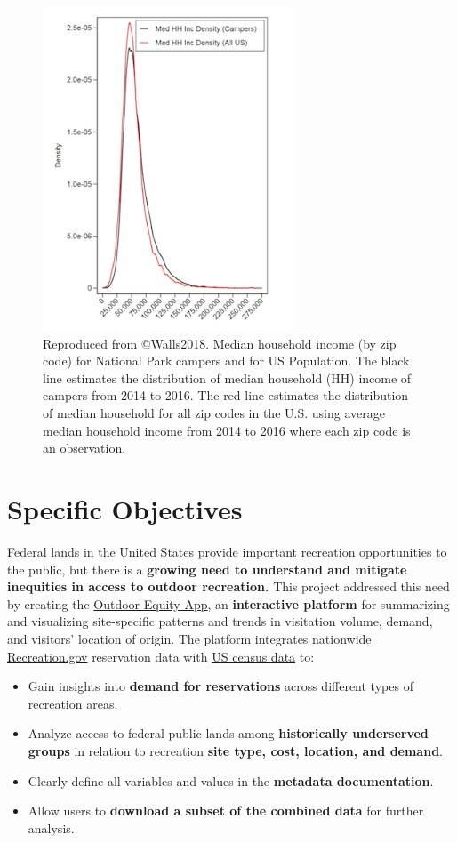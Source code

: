 \documentclass[
  11 pt,
  openany]{book}
\providecommand{\tightlist}{%
  \setlength{\itemsep}{0pt}\setlength{\parskip}{0pt}}
\begin{document}
\begin{figure}
\includegraphics[width=2.95in]{images/problem_statement_figure_4} \caption{Reproduced from @Walls2018. Median household income (by zip code) for National Park campers and for US Population. The black line estimates the distribution of median household (HH) income of campers from 2014 to 2016. The red line estimates the distribution of median household for all zip codes in the U.S. using average median household income from 2014 to 2016 where each zip code is an observation.}\label{fig:fig4}
\end{figure}

\hypertarget{specific-objectives}{%
\chapter{Specific Objectives}\label{specific-objectives}}

Federal lands in the United States provide important recreation opportunities to the public, but there is a \textbf{growing need to understand and mitigate inequities in access to outdoor recreation.} This project addressed this need by creating the \href{https://shinyapps.bren.ucsb.edu/oe_app/}{Outdoor Equity App}, an \textbf{interactive platform} for summarizing and visualizing site-specific patterns and trends in visitation volume, demand, and visitors' location of origin. The platform integrates nationwide \href{https://www.recreation.gov/}{Recreation.gov} reservation data with \href{https://www.census.gov/data.html}{US census data} to:

\begin{itemize}
\tightlist
\item
  Gain insights into \textbf{demand for reservations} across different types of recreation areas.
\item
  Analyze access to federal public lands among \textbf{historically underserved groups} in
  relation to recreation \textbf{site type, cost, location, and demand}.
\item
  Clearly define all variables and values in the \textbf{metadata documentation}.
\item
  Allow users to \textbf{download a subset of the combined data} for further analysis.
\end{itemize}
\end{document}
